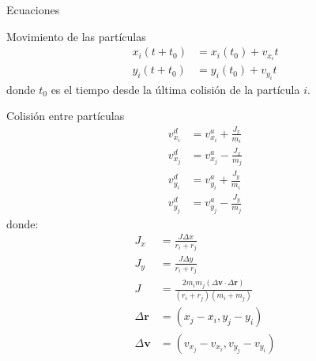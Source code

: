 \begin{frame}{Ecuaciones}

    \begin{block}{Movimiento de las partículas}
        \begin{equation}
            \begin{aligned}
                x_i(t+t_0) &= x_i(t_0) + v_{x_i}t \\
                y_i(t+t_0) &= y_i(t_0) + v_{y_i}t
            \end{aligned}\label{eq:equation-particles-movement}
        \end{equation}
        donde \(t_0\) es el tiempo desde la última colisión de la partícula \(i\).
    \end{block}

    \begin{block}{Colisión entre partículas}
        \begin{equation}
            \begin{aligned}
                v_{x_i}^{d} &= v_{x_i}^{a} + \frac{J_x}{m_i} \\
                v_{x_j}^{d} &= v_{x_j}^{a} - \frac{J_x}{m_j} \\
                v_{y_i}^{d} &= v_{y_i}^{a} + \frac{J_y}{m_i} \\
                v_{y_j}^{d} &= v_{y_j}^{a} - \frac{J_y}{m_j}
            \end{aligned}\label{eq:equation-particles-collision}
        \end{equation}
        donde:
        \begin{equation}
            \begin{aligned}
                J_x &= \frac{J\Delta{x}}{r_i+r_j} \\
                J_y &= \frac{J\Delta{y}}{r_i+r_j} \\
                J &= \frac{2 m_i m_j (\Delta{\mathbf{v}} \cdot \Delta{\mathbf{r}})}{(r_i+r_j)(m_i+m_j)} \\
                \Delta{\mathbf{r}} &= (x_j - x_i, y_j - y_i) \\
                \Delta{\mathbf{v}} &= (v_{x_j} - v_{x_i}, v_{y_j} - v_{y_i})
            \end{aligned}\label{eq:equation-particles-collision-variables}
        \end{equation}
    \end{block}

\end{frame}

